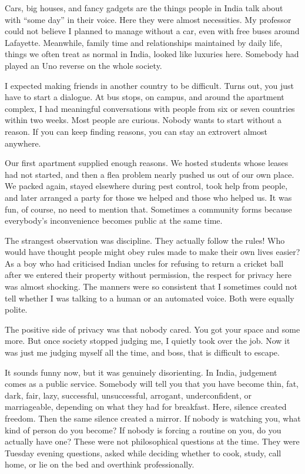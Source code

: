 \documentclass[11pt,twoside,openany]{book}
\newcommand{\scene}{\par\vspace{0.7em}{\centering\color{accent}\rule{0.85cm}{0.6pt}\par}\vspace{0.5em}\noindent\ignorespaces}
\begin{document}
Cars, big houses, and fancy gadgets are the things people in India talk about
with ``some day'' in their voice. Here they were almost necessities. My
professor could not believe I planned to manage without a car, even with free
buses around Lafayette. Meanwhile, family time and relationships maintained
by daily life, things we often treat as normal in India, looked like luxuries
here. Somebody had played an Uno reverse on the whole society.

I expected making friends in another country to be difficult. Turns out, you
just have to start a dialogue. At bus stops, on campus, and around the
apartment complex, I had meaningful conversations with people from six or
seven countries within two weeks. Most people are curious. Nobody wants to
start without a reason. If you can keep finding reasons, you can stay an
extrovert almost anywhere.

Our first apartment supplied enough reasons. We hosted students whose leases
had not started, and then a flea problem nearly pushed us out of our own
place. We packed again, stayed elsewhere during pest control, took help from
people, and later arranged a party for those we helped and those who helped
us. It was fun, of course, no need to mention that. Sometimes a community
forms because everybody's inconvenience becomes public at the same time.

\scene

The strangest observation was discipline. They actually follow the rules!
Who would have thought people might obey rules made to make their own lives
easier? As a boy who had criticised Indian uncles for refusing to return a
cricket ball after we entered their property without permission, the respect
for privacy here was almost shocking. The manners were so consistent that I
sometimes could not tell whether I was talking to a human or an automated
voice. Both were equally polite.

The positive side of privacy was that nobody cared. You got your space and
some more. But once society stopped judging me, I quietly took over the job.
Now it was just me judging myself all the time, and boss, that is difficult
to escape.

It sounds funny now, but it was genuinely disorienting. In India, judgement
comes as a public service. Somebody will tell you that you have become thin,
fat, dark, fair, lazy, successful, unsuccessful, arrogant, underconfident, or
marriageable, depending on what they had for breakfast. Here, silence created
freedom. Then the same silence created a mirror. If nobody is watching you,
what kind of person do you become? If nobody is forcing a routine on you, do
you actually have one? These were not philosophical questions at the time.
They were Tuesday evening questions, asked while deciding whether to cook,
study, call home, or lie on the bed and overthink professionally.
\end{document}

